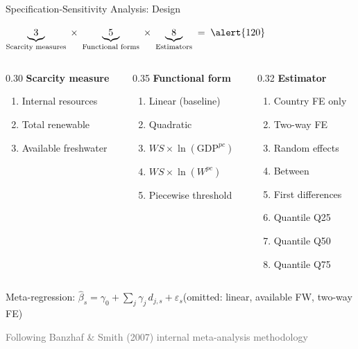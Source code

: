 \documentclass[aspectratio=169,12pt]{beamer}
\newcommand{\source}[1]{\vfill\hfill{\tiny\textcolor{dimgray}{#1}}}
\begin{document}
\begin{frame}{Specification-Sensitivity Analysis: Design}

\begin{center}
$\underbrace{3}_{\text{Scarcity measures}} \;\times\; \underbrace{5}_{\text{Functional forms}} \;\times\; \underbrace{8}_{\text{Estimators}} \;=\; \alert{120}$ 
\end{center}

\vspace{0.2cm}

\begin{columns}[T]
\begin{column}{0.30\textwidth}
\textbf{Scarcity measure}\\[4pt]
{\small
\begin{enumerate}
    \item Internal resources
    \item Total renewable
    \item Available freshwater
\end{enumerate}
}
\end{column}

\begin{column}{0.35\textwidth}
\textbf{Functional form}\\[4pt]
{\small
\begin{enumerate}
    \item Linear (baseline)
    \item Quadratic
    \item $WS \times \ln(\text{GDP}^{pc})$
    \item $WS \times \ln(W^{pc})$
    \item Piecewise threshold
\end{enumerate}
}
\end{column}

\begin{column}{0.32\textwidth}
\textbf{Estimator}\\[4pt]
{\small
\begin{enumerate}
    \item Country FE only
    \item Two-way FE
    \item Random effects
    \item Between
    \item First differences
    \item Quantile Q25
    \item Quantile Q50
    \item Quantile Q75
\end{enumerate}
}
\end{column}
\end{columns}

\vspace{0.3cm}
\centering
{\small Meta-regression: $\hat{\beta}_s = \gamma_0 + \sum_j \gamma_j\, d_{j,s} + \varepsilon_s$\quad (omitted: linear, available FW, two-way FE)}

\source{Following Banzhaf \& Smith (2007) internal meta-analysis methodology}
\end{frame}
\end{document}
